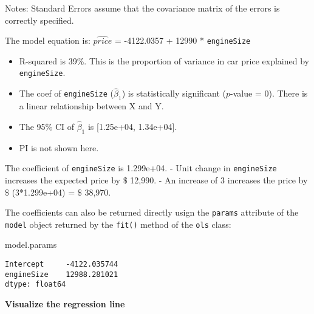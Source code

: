 \documentclass[
  letterpaper,
  DIV=11,
  numbers=noendperiod]{scrreprt}
\newenvironment{Shaded}{\begin{snugshade}}{\end{snugshade}}
\newcommand{\NormalTok}[1]{\textcolor[rgb]{0.00,0.23,0.31}{#1}}
\providecommand{\tightlist}{%
  \setlength{\itemsep}{0pt}\setlength{\parskip}{0pt}}\usepackage{longtable,booktabs,array}
\begin{document}
Notes: \newline
 [1] Standard Errors assume that the covariance matrix of the errors is correctly specified.

The model equation is: \(\hat{price}\) = -4122.0357 + 12990 *
\texttt{engineSize}

\begin{itemize}
\tightlist
\item
  R-squared is 39\%. This is the proportion of variance in car price
  explained by \texttt{engineSize}.
\item
  The coef of \texttt{engineSize} (\(\hat{\beta}_1\)) is statistically
  significant (\(p\)-value = 0). There is a linear relationship between
  X and Y.
\item
  The 95\% CI of \(\hat{\beta}_1\) is {[}1.25e+04, 1.34e+04{]}.
\item
  PI is not shown here.
\end{itemize}

The coefficient of \texttt{engineSize} is 1.299e+04. - Unit change in
\texttt{engineSize} increases the expected price by \(\$\) 12,990. - An
increase of 3 increases the price by \(\$\) (3*1.299e+04) = \(\$\)
38,970.

The coefficients can also be returned directly usign the \texttt{params}
attribute of the \texttt{model} object returned by the \texttt{fit()}
method of the \texttt{ols} class:

\begin{Shaded}
\begin{Highlighting}[]
\NormalTok{model.params}
\end{Highlighting}
\end{Shaded}

\begin{verbatim}
Intercept     -4122.035744
engineSize    12988.281021
dtype: float64
\end{verbatim}

\textbf{Visualize the regression line}
\end{document}
